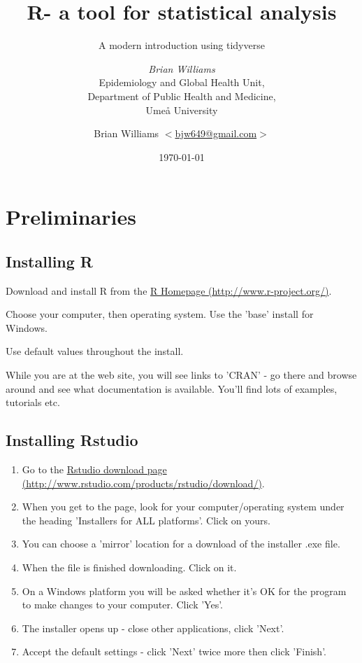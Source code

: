 \documentclass[titlepage]{book}\usepackage{knitr}
\title{\huge \textbf{ R- a tool for statistical analysis }\vspace{+1cm}  }
\subtitle{A modern introduction using tidyverse}
\author{{\LARGE \emph{Brian Williams}}\vspace{+1cm} \\
 Epidemiology and Global Health Unit,\\
 Department of Public Health and Medicine,\\
 Umeå University \vspace{+8cm}}
\date{\today}
\begin{document}
\maketitle

\frontmatter








\chapter*{Preliminaries}

\author{Brian Williams $<$\href{mailto:bjw649@gmail.com}%
{bjw649@gmail.com}$>$}

\section*{Installing R}
Download and install R from the  \href{http://www.r-project.org/}{R Homepage (http://www.r-project.org/)}.

Choose your computer, then operating system.  Use the 'base' install for Windows.

Use default values throughout the install.

While you are at the web site, you will see links to 'CRAN' -  go there and browse around and see what documentation is available.  You'll find lots of examples, tutorials etc.

\section*{Installing Rstudio}
\begin{enumerate}
\item{Go to the \href{http://www.rstudio.com/products/rstudio/download/}{Rstudio download page (http://www.rstudio.com/products/rstudio/download/)}.}
\item{When you get to the page, look for your computer/operating system under the heading 'Installers for ALL platforms'.  Click on yours.}
\item{You can choose a 'mirror' location for a download of the installer .exe file.}
\item{When the file is finished downloading. Click on it.}
\item{On a Windows platform you will be asked whether it's OK for the program to make changes to your computer. Click 'Yes'.}
\item{The installer opens up - close other applications, click 'Next'.}
\item{Accept the default settings - click 'Next' twice more then click 'Finish'.}
\end{enumerate}
\end{document}
